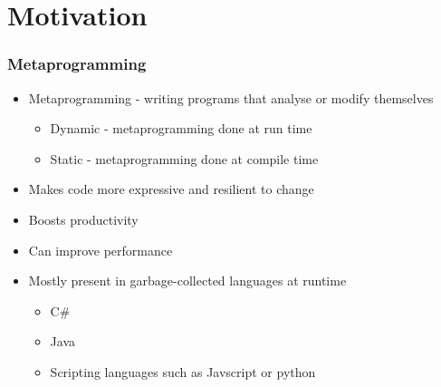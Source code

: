 \section{Motivation}


\begin{frame}
	\frametitle{Metaprogramming}

	\begin{itemize}
		\item Metaprogramming - writing programs that analyse or modify themselves\begin{itemize}
			      \item Dynamic - metaprogramming done at run time
			      \item Static - metaprogramming done at compile time
		      \end{itemize}
		\item Makes code more expressive and resilient to change
		\item Boosts productivity
		\item Can improve performance
		\item Mostly present in garbage-collected languages at runtime\begin{itemize}
			      \item C\#
			      \item Java
			      \item Scripting languages such as Javscript or python
		      \end{itemize}
	\end{itemize}

\end{frame}


